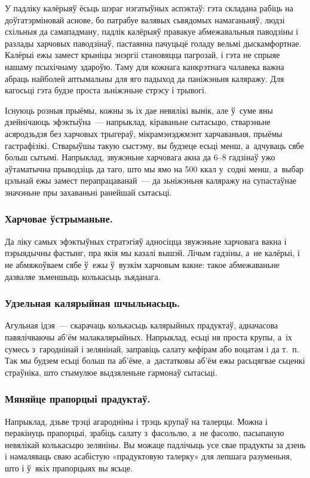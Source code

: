 У падліку калёрыяў ёсьць шэраг нэгатыўных аспэктаў: гэта складана рабіць на доўгатэрміновай аснове, бо патрабуе валявых сьвядомых намаганьняў, людзі схільныя да самападману, падлік калёрыяў правакуе абмежавальныя паводзіны і разлады харчовых паводзінаў, пастаянна пачуцьцё голаду вельмі дыскамфортнае. Калёрыі ежы замест крыніцы энэргіі становяцца пагрозай, і гэта не спрыяе нашаму псыхічнаму здароўю. Таму для кожнага канкрэтнага чалавека важна абраць найболей аптымальны для яго падыход да паніжэньня каляражу. Для кагосьці гэта будзе проста зьніжэньне стрэсу і трывогі.

Існуюць розныя прыёмы, кожны зь іх дае невялікі вынік, але ў~суме яны дзейнічаюць эфэктыўна~--- напрыклад, кіраваньне сытасьцю, стварэньне асяродзьдзя без харчовых трыгераў, мікрамэнэджмэнт харчаваньня, прыёмы гастрафізікі. Стварыўшы такую сыстэму, вы будзеце есьці менш, а~адчуваць сябе больш сытымі. Напрыклад, звужэньне харчовага акна да 6--8 гадзінаў ужо аўтаматычна прыводзіць да таго, што мы ямо на 500 ккал у~содні менш, а~выбар цэльнай ежы замест перапрацаванай~--- да зьніжэньня каляражу на супастаўнае значэньне пры захаваньні ранейшай сытасьці.

\subsubsection{Харчовае ўстрыманьне.}
Да ліку самых эфэктыўных стратэгіяў адносіцца звужэньне харчовага вакна і пэрыядычны фастынг, пра якія мы казалі вышэй. Лічым гадзіны, а~не калёрыі, і не абмяжоўваем сябе ў~ежы ў~вузкім харчовым вакне: такое абмежаваньне дазваляе зьменшыць колькасьць зьяданага.

\subsubsection{Удзельная калярыйная шчыльнасьць.}
Агульная ідэя~--- скарачаць колькасьць калярыйных прадуктаў, адначасова павялічваючы аб'ём малакалярыйных. Напрыклад, есьці ня проста крупы, а~іх сумесь з~гароднінай і зелянінай, заправіць салату кефірам або воцатам і да т.~п. Так мы будзем есьці больш па аб'ёме, а~дастатковы аб'ём ежы расьцягвае сьценкі страўніка, што стымулюе выдзяленьне гармонаў сытасьці.

\subsubsection{Мяняйце прапорцыі прадуктаў.}
Напрыклад, дзьве трэці агародніны і трэць крупаў на талерцы. Можна і перакінуць прапорцыі, зрабіць салату з~фасольлю, а~не фасолю, пасыпаную невялікай колькасьцю зеляніны. Вы можаце падлічыць усе свае прадукты за дзень і намаляваць сваю асабістую «прадуктовую талерку» для лепшага разуменьня, што і ў~якіх прапорцыях вы ясьце. 

